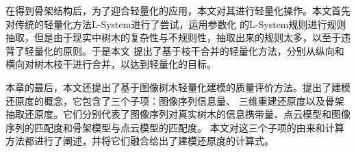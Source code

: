 在得到骨架结构后，为了迎合轻量化的应用，本文对其进行轻量化操作。本文首先对传统的轻量化方法L-System进行了尝试，运用参数化
的L-System规则进行规则抽取，但是由于现实中树木的复杂性与不规则性，抽取出来的规则太多，以至于违背了轻量化的原则。于是本文
提出了基于枝干合并的轻量化方法，分别从纵向和横向对树木枝干进行合并，以达到轻量化的目标。

本章的最后，本文还提出了基于图像树木轻量化建模的质量评价方法。提出了建模还原度的概念，它包含了三个子项：图像序列信息量、
三维重建还原度以及骨架抽取还原度。它们分别代表了图像序列对真实树木的信息携带量、点云模型和图像序列的匹配度和骨架模型与点云模型的匹配度。
本文对这三个子项的由来和计算方法都进行了阐述，并将它们融合给出了建模还原度的计算式。
